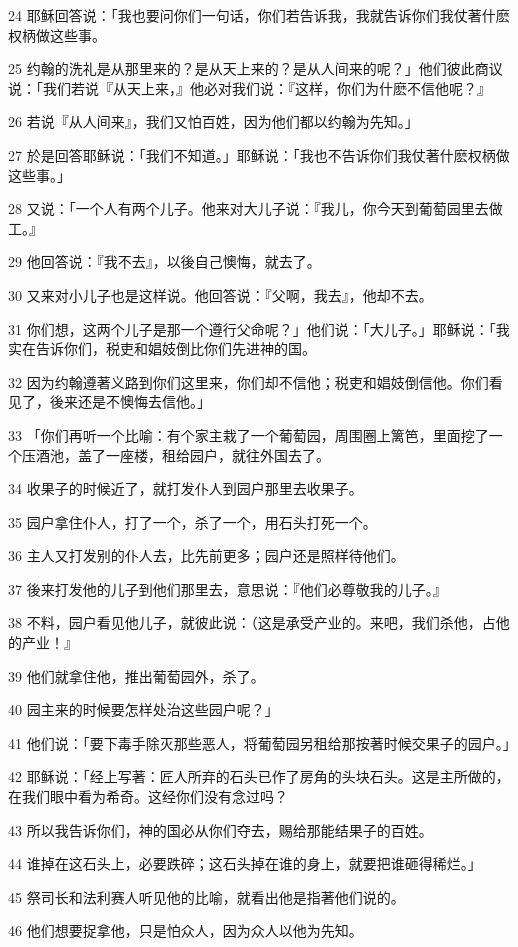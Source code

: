 \par 24 耶稣回答说：「我也要问你们一句话，你们若告诉我，我就告诉你们我仗著什麽权柄做这些事。
\par 25 约翰的洗礼是从那里来的？是从天上来的？是从人间来的呢？」他们彼此商议说：「我们若说『从天上来，』他必对我们说：『这样，你们为什麽不信他呢？』
\par 26 若说『从人间来』，我们又怕百姓，因为他们都以约翰为先知。」
\par 27 於是回答耶稣说：「我们不知道。」耶稣说：「我也不告诉你们我仗著什麽权柄做这些事。」
\par 28 又说：「一个人有两个儿子。他来对大儿子说：『我儿，你今天到葡萄园里去做工。』
\par 29 他回答说：『我不去』，以後自己懊悔，就去了。
\par 30 又来对小儿子也是这样说。他回答说：『父啊，我去』，他却不去。
\par 31 你们想，这两个儿子是那一个遵行父命呢？」他们说：「大儿子。」耶稣说：「我实在告诉你们，税吏和娼妓倒比你们先进神的国。
\par 32 因为约翰遵著义路到你们这里来，你们却不信他；税吏和娼妓倒信他。你们看见了，後来还是不懊悔去信他。」
\par 33 「你们再听一个比喻：有个家主栽了一个葡萄园，周围圈上篱笆，里面挖了一个压酒池，盖了一座楼，租给园户，就往外国去了。
\par 34 收果子的时候近了，就打发仆人到园户那里去收果子。
\par 35 园户拿住仆人，打了一个，杀了一个，用石头打死一个。
\par 36 主人又打发别的仆人去，比先前更多；园户还是照样待他们。
\par 37 後来打发他的儿子到他们那里去，意思说：『他们必尊敬我的儿子。』
\par 38 不料，园户看见他儿子，就彼此说：（这是承受产业的。来吧，我们杀他，占他的产业！』
\par 39 他们就拿住他，推出葡萄园外，杀了。
\par 40 园主来的时候要怎样处治这些园户呢？」
\par 41 他们说：「要下毒手除灭那些恶人，将葡萄园另租给那按著时候交果子的园户。」
\par 42 耶稣说：「经上写著：匠人所弃的石头已作了房角的头块石头。这是主所做的，在我们眼中看为希奇。这经你们没有念过吗？
\par 43 所以我告诉你们，神的国必从你们夺去，赐给那能结果子的百姓。
\par 44 谁掉在这石头上，必要跌碎；这石头掉在谁的身上，就要把谁砸得稀烂。」
\par 45 祭司长和法利赛人听见他的比喻，就看出他是指著他们说的。
\par 46 他们想要捉拿他，只是怕众人，因为众人以他为先知。

